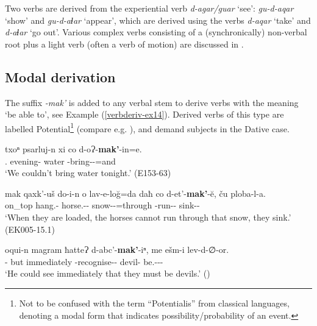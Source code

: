Two verbs are derived from the experiential verb \textit{d-agar/guar} `see': \textit{gu-d-aqar} `show' and \textit{gu-d-aɬar} `appear', which are derived using the verbs \textit{d-aqar} `take' and \textit{d-aɬar} `go out'. Various complex verbs consisting of a (synchronically) non-verbal root plus a light verb (often a verb of motion) are discussed in .



\subsection{Modal derivation} \label{potential}\largerpage

The suffix \textit{-mak'} is added to any verbal stem to derive verbs with the meaning `be able to', see Example (\ref{verbderiv-ex14}). Derived verbs of this type are labelled Potential\footnote{Not to be confused with the term “Potentialis” from classical languages, denoting a modal form that indicates possibility\slash probability of an event.} (compare e.g. \cite{comrieetal2015valencybezhta}), and demand subjects in the Dative case. 

\begin{exe}
	\ex\label{verbderiv-ex14}
	\begin{xlist}
		
		
			\ex\label{verbderiv-ex14a}
			\gll txoⁿ psarluj-n xi co d-oɁ-\textbf{mak'}-in=e. \\
			{\Fpl}.{\Dat} evening-{\Dat} water {\Neg} {\D}-bring-\textbf{{\Pot}}-{\Aor}=and \\
			\trans `We couldn't bring water tonight.'
			\hfill (E153-63)
		
		
		
			\ex\label{verbderiv-ex14b}
			\gll mak qaxk'-uš do-i-n o lav-e-lo\u{g}=da daħ co d-et'-\textbf{mak'}-\u{e}, ču ploba-l-a.  \\
			on\_top hang.{\Pl}-{\Simul} horse.{\Obl}-{\Pl}-{\Dat} {\Dist} snow-{\Obl}-{\Intertrans}=through  {\Pv} {\Neg} {\D}-run-\textbf{{\Pot}}-{\Npst} {\Pv} sink-{\Intr}-{\Npst} \\
			\trans `When they are loaded, the horses cannot run through that snow, they sink.'
			\hfill (EK005-15.1)
		
		
		
		
		
			\ex\label{verbderiv-ex14c}
			\gll oqui-n magram ħatteɁ d-abc'-\textbf{mak'}-iⁿ, me ešm-i lev-d-∅-or. \\
			{\Dist}-{\Dat} but immediately {\D}-recognise-\textbf{{\Pot}}-{\Aor} {\Subord} devil-{\Pl} be.{\Nw}-{\D}-{\Tr}-{\Imprf} \\
			\trans `He could see immediately that they must be devils.'
			\hfill (\cite{kojima09})
		
		
	\end{xlist}
\end{exe}

